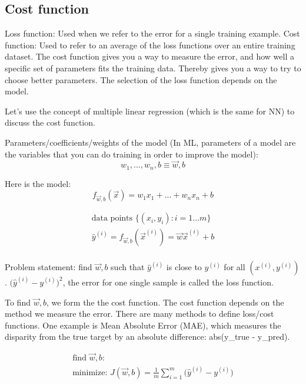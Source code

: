 \documentclass[12pt]{report}
\begin{document}
\subsection{Cost function}
\label{sec:cost}
Loss function: Used when we refer to the error for a single training example. Cost function: Used to refer to an average of the loss functions over an entire training dataset.
The cost function gives you a way to measure the error, and how well a specific set of parameters fits the training data. Thereby gives you a way to try to choose better parameters. The selection of the loss function depends on the model.

Let's use the concept of multiple linear regression (which is the same for NN) to discuss the cost function.

Parameters/coefficients/weights of the model (In ML, parameters of a model are the variables that you can do training in order to improve the model):
\begin{equation}
  w_1, . . . , w_n , b \equiv \overrightarrow{w} ,b
\end{equation}

Here is the model:
\begin{equation}
	f_{\overrightarrow{w},b} (\overrightarrow{x}) = w_1x_1 +  ... + w_nx_n + b
\end{equation}

\begin{multline}
		\text{data points } \{(x_i, y_i): i=1 ... m \} \\
    \hat{y}^{(i)} = f_{\overrightarrow{w},b} (\overrightarrow{x}^{(i)})  = \overrightarrow{w} \overrightarrow{x} ^ {(i)} + b \\
\end{multline}

Problem statement: find $\overrightarrow{w},b$ such that $\hat{y}^{(i)}$ is close to $y^{(i)}$ for all $(x^{(i)}, y^{(i)} )$. $\big(\hat{y}^{(i)}  - y^{(i)} \big) ^2$, the error for one single sample is called the loss function.

To find $\overrightarrow{w},b$, we form the the cost function. The cost function depends on the method we measure the error. There are many methods to define loss/cost functions. One example is Mean Absolute Error (MAE), which measures the disparity from the true target by an absolute difference: abs(y\_true - y\_pred).

\begin{multline}
  \text{find $\overrightarrow{w},b$:} \\
  \text{minimize:  }  J(\overrightarrow{w},b) = \frac{1}{m} \sum_{i=1}^{m} \big(\hat{y}^{(i)}  - y^{(i)} \big) \\
\end{multline}
\end{document}

